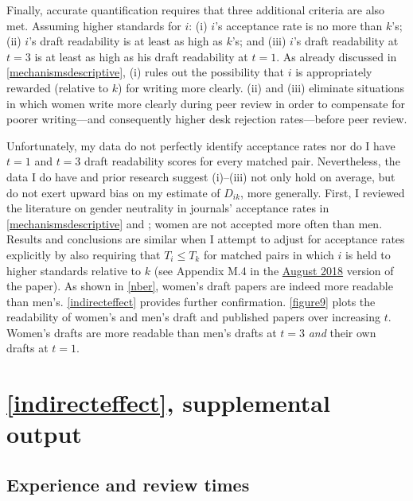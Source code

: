 \begin{appendices}
\begin{refsection}
Finally, accurate quantification requires that three additional criteria are also met. Assuming higher standards for $i$: (i) $i$'s acceptance rate is no more than $k$'s; (ii) $i$'s draft readability is at least as high as $k$'s; and (iii) $i$'s draft readability at $t=3$ is at least as high as his draft readability at $t=1$. As already discussed in \autoref{mechanismsdescriptive}, (i) rules out the possibility that $i$ is appropriately rewarded (relative to $k$) for writing more clearly. (ii) and (iii) eliminate situations in which women write more clearly during peer review in order to compensate for poorer writing---and consequently higher desk rejection rates---before peer review.

Unfortunately, my data do not perfectly identify acceptance rates nor do I have $t=1$ and $t=3$ draft readability scores for every matched pair. Nevertheless, the data I do have and prior research suggest (i)--(iii) not only hold on average, but do not exert upward bias on my estimate of $D_{ik}$, more generally. First, I reviewed the literature on gender neutrality in journals' acceptance rates in \autoref{mechanismsdescriptive} and ; women are not accepted more often than men. Results and conclusions are similar when I attempt to adjust for acceptance rates explicitly by also requiring that $T_{i}\le T_{k}$ for matched pairs in which $i$ is held to higher standards relative to $k$ (see Appendix M.4 in the \href{http://www.erinhengel.com/research/publishing_female20180828.pdf}{August 2018} version of the paper). As shown in \autoref{nber}, women's draft papers are indeed more readable than men's. \autoref{indirecteffect} provides further confirmation. \autoref{figure9} plots the readability of women's and men's draft and published papers over increasing $t$. Women's drafts are more readable than men's drafts at $t=3$ \emph{and} their own drafts at $t=1$.

\clearpage

\section{\autoref{indirecteffect}, supplemental output}
\label{appendixindirecteffect}

\subsection{Experience and review times}
\label{appendixtimeexp}


\end{refsection}
\end{appendices}
